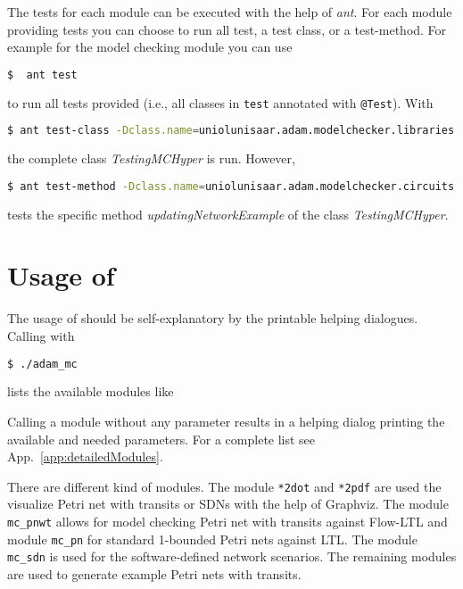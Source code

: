 \documentclass[12pt,twoside,a4paper,openright]{memoir}
\begin{document}
The tests for each module can be executed with the help of \emph{ant}.
For each module providing tests you can choose to run all test, a test class, or a test-method. 
For example for the model checking module you can use
\begin{lstlisting}[language=bash]
$  ant test
\end{lstlisting}
to run all tests provided (i.e., all classes in \texttt{test} annotated with \texttt{@Test}). With 
\begin{lstlisting}[language=bash,breaklines=true]
$ ant test-class -Dclass.name=uniolunisaar.adam.modelchecker.libraries.TestingMCHyper
\end{lstlisting}
the complete class \emph{TestingMCHyper} is run. However,
\begin{lstlisting}[language=bash,breaklines=true]
$ ant test-method -Dclass.name=uniolunisaar.adam.modelchecker.circuits.TestingModelcheckingFlowLTLParallel -Dmethod.name=updatingNetworkExample
\end{lstlisting}
tests the specific method \emph{updatingNetworkExample} of the class \emph{TestingMCHyper}.


\chapter{Usage of \tool}
\label{sec:usage}
The usage of \tool{} should be self-explanatory by the printable helping dialogues.
Calling \tool{} with
\begin{lstlisting}[language=bash]
  $ ./adam_mc
\end{lstlisting}
lists the available modules like

Calling a module without any parameter results in a helping dialog printing 
the available and needed parameters. For a complete list see App.~\ref{app:detailedModules}.

There are different kind of modules.
The module \texttt{*2dot} and \texttt{*2pdf} are
used the visualize Petri net with transits or SDNs with the help of Graphviz.
The module \texttt{mc\_pnwt} allows for model checking Petri net with transits against Flow-LTL
and module \texttt{mc\_pn} for standard 1-bounded Petri nets against LTL.
The module \texttt{mc\_sdn} is used for the software-defined network scenarios.
The remaining modules are used to generate example Petri nets with transits.  
\end{document}

